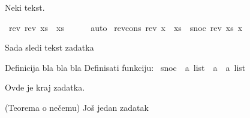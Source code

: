 %
\begin{isabellebody}%
%
%
\isadelimtheory
%
\endisadelimtheory
%
\isatagtheory
%
\endisatagtheory
{\isafoldtheory}%
%
\isadelimtheory
%
\endisadelimtheory
%
\isadelimdocument
%
\endisadelimdocument
%
\isatagdocument
%
\isamarkuptrue%
%
\endisatagdocument
{\isafolddocument}%
%
\isadelimdocument
%
\endisadelimdocument
%
\begin{isamarkuptext}%
Neki tekst.%
\end{isamarkuptext}\isamarkuptrue%
\isamarkupfalse%
\ {\isachardoublequoteopen}rev\ {\isacharparenleft}{\kern0pt}rev\ xs{\isacharparenright}{\kern0pt}\ {\isacharequal}{\kern0pt}\ xs{\isachardoublequoteclose}\isanewline
%
\isadelimproof
\ \ \ \ %
\endisadelimproof
%
\isatagproof
{}\isamarkupfalse%
\ auto%
\endisatagproof
{\isafoldproof}%
%
\isadelimproof
\isanewline
%
\endisadelimproof
\isanewline
{}\isamarkupfalse%
\ rev{\isacharunderscore}{\kern0pt}cons{\isacharcolon}{\kern0pt}\ {\isachardoublequoteopen}rev\ {\isacharparenleft}{\kern0pt}x\ {\isacharhash}{\kern0pt}\ xs{\isacharparenright}{\kern0pt}\ {\isacharequal}{\kern0pt}\ snoc\ {\isacharparenleft}{\kern0pt}rev\ xs{\isacharparenright}{\kern0pt}\ x{\isachardoublequoteclose}%
\isadelimproof
%
\endisadelimproof
%
\isatagproof
%
\endisatagproof
{\isafoldproof}%
%
\isadelimproof
%
\endisadelimproof
%
\begin{exercise}[subtitle=Ovo je naslov zadatka]
%
\begin{isamarkuptext}%
Sada sledi tekst zadatka%
\end{isamarkuptext}\isamarkuptrue%
%
\begin{xca}{Definicija bla bla bla} Definisati funkciju:
\isamarkupfalse%
\ snoc\ {\isacharcolon}{\kern0pt}{\isacharcolon}{\kern0pt}\ {\isachardoublequoteopen}{\isacharprime}{\kern0pt}a\ list\ {\isasymRightarrow}\ {\isacharprime}{\kern0pt}a\ {\isasymRightarrow}\ {\isacharprime}{\kern0pt}a\ list{\isachardoublequoteclose}%
\end{xca}
%
\begin{isamarkuptext}%
Ovde je kraj zadatka.%
\end{isamarkuptext}\isamarkuptrue%
%
\end{exercise}
%
\begin{isamarkuptext}%
\begin{thm}{(Teorema o nečemu)} Još jedan zadatak  \end{thm}%

\end{isamarkuptext}
\end{isabellebody}
